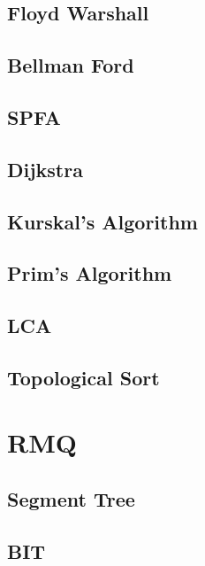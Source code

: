     \subsection{Floyd Warshall}
        
    \subsection{Bellman Ford}
        
    \subsection{SPFA}
        
    \subsection{Dijkstra}
        
    \subsection{Kurskal's Algorithm}
        
    \subsection{Prim's Algorithm}
        
    \subsection{LCA}
        
    \subsection{Topological Sort}
        


\section{RMQ}
    \subsection{Segment Tree}
        
    \subsection{BIT}
        
